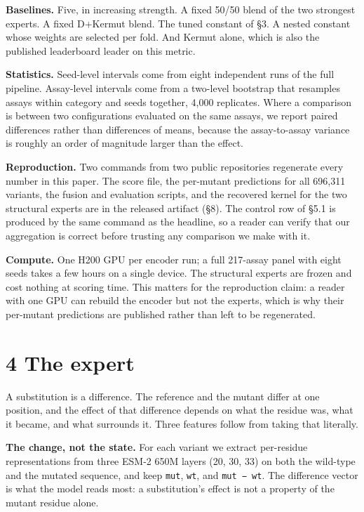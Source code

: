 \documentclass[sigconf,review,nonacm]{acmart}
\begin{document}
\textbf{Baselines.} Five, in increasing strength. A fixed 50/50 blend of the two strongest experts. A fixed
D+Kermut blend. The tuned constant of §3. A nested constant whose weights are selected per fold. And
Kermut alone, which is also the published leaderboard leader on this metric.

\textbf{Statistics.} Seed-level intervals come from eight independent runs of the full pipeline. Assay-level
intervals come from a two-level bootstrap that resamples assays within category and seeds together,
4,000 replicates. Where a comparison is between two configurations evaluated on the same assays, we
report paired differences rather than differences of means, because the assay-to-assay variance is
roughly an order of magnitude larger than the effect.

\textbf{Reproduction.} Two commands from two public repositories regenerate every number in this paper. The
score file, the per-mutant predictions for all 696,311 variants, the fusion and evaluation scripts, and
the recovered kernel for the two structural experts are in the released artifact (§8). The control row
of §5.1 is produced by the same command as the headline, so a reader can verify that our aggregation is
correct before trusting any comparison we make with it.

\textbf{Compute.} One H200 GPU per encoder run; a full 217-assay panel with eight seeds takes a few hours on
a single device. The structural experts are frozen and cost nothing at scoring time. This matters for
the reproduction claim: a reader with one GPU can rebuild the encoder but not the experts, which is why
their per-mutant predictions are published rather than left to be regenerated.

\hypertarget{the-expert}{%
\section{4 The expert}\label{the-expert}}

A substitution is a difference. The reference and the mutant differ at one position, and the effect of
that difference depends on what the residue was, what it became, and what surrounds it. Three features
follow from taking that literally.

\textbf{The change, not the state.} For each variant we extract per-residue representations from three ESM-2
650M layers (20, 30, 33) on both the wild-type and the mutated sequence, and keep \texttt{mut}, \texttt{wt}, and
\texttt{mut\ −\ wt}. The difference vector is what the model reads most: a substitution's effect is not a
property of the mutant residue alone.
\end{document}
